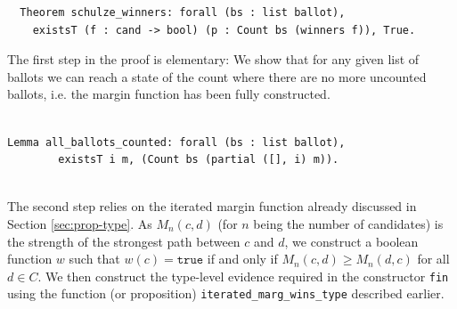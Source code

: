 \begin{verbatim}
  Theorem schulze_winners: forall (bs : list ballot),
    existsT (f : cand -> bool) (p : Count bs (winners f)), True.
\end{verbatim}


\noindent
The first step in the proof is elementary: We show that for any
given
list of ballots we can reach a state of the count where there are
no more uncounted ballots, i.e. the margin function has been
fully constructed.


\begin{verbatim}

Lemma all_ballots_counted: forall (bs : list ballot), 
        existsT i m, (Count bs (partial ([], i) m)).
        
\end{verbatim}
    

   
   
The second step relies on the iterated margin function already
discussed in Section \ref{sec:prop-type}. As $M_n(c, d)$ (for $n$ being
the number of candidates) is the strength of the strongest path
between $c$ and $d$, we construct a boolean function
$w$ such that $w(c) = \mathtt{true}$ if and only if $M_n(c, d) \geq
M_n(d, c)$ for all $d \in C$. We then construct the type-level
evidence required in the constructor \texttt{fin} 
using  the function (or proposition)
\texttt{iterated\_marg\_wins\_type} described earlier. 


